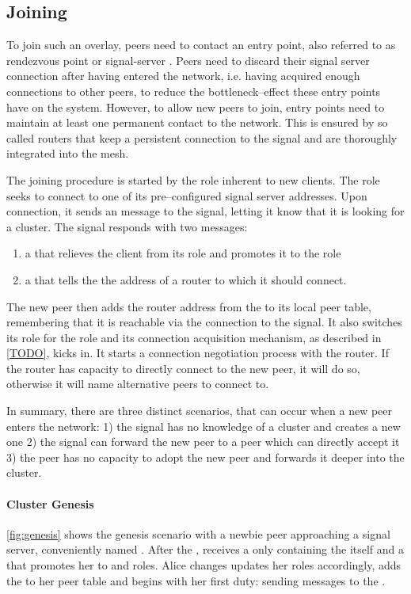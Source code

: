 \subsection{Joining}
To join such an overlay, peers need to contact an entry point, also referred to as rendezvous point or \gls{signal-server} \cite{TODO}.
Peers need to discard their signal server connection after having entered the network, i.e. having acquired enough connections to other peers, to reduce the bottleneck–effect these entry points have on the system.
However, to allow new peers to join, entry points need to maintain at least one permanent contact to the network. This is ensured by so called \glspl{router} that keep a persistent connection to the signal and are thoroughly integrated into the mesh.

The joining procedure is started by the \newbieRole role inherent to new clients. The \newbieRole role seeks to connect to one of its pre–configured signal server addresses.
Upon connection, it sends an \introduction message to the signal, letting it know that it is looking for a cluster. The signal responds with two messages:
\begin{enumerate}
    \item a \roleUpdate that relieves the client from its \newbieRole role and promotes it to the \peerRole role
    \item a \peerUpdate that tells the \newbieRole the address of a \gls{router} to which it should connect.
\end{enumerate}
The new peer then adds the router address from the \peerUpdate to its local peer table, remembering that it is reachable via the connection to the signal.
It also switches its \newbieRole role for the \peerRole role and its connection acquisition mechanism, as described in \ref{TODO}, kicks in. It starts a connection negotiation process with the router. If the router has capacity to directly connect to the new peer, it will do so, otherwise it will name alternative peers to connect to.

In summary, there are three distinct scenarios, that can occur when a new peer enters the network: 1) the signal has no knowledge of a cluster and creates a new one 2) the signal can forward the new peer to a \routerRole peer which can directly accept it 3) the \routerRole peer has no capacity to adopt the new peer and forwards it deeper into the cluster.

\paragraph{Cluster Genesis}
\vref{fig:genesis} shows the genesis scenario with a newbie peer \alice approaching a signal server, conveniently named \signal. After the \introduction, \alice receives a \peerUpdate only containing the \signal itself and a \roleUpdate that promotes her to \peerRole and \routerRole roles. Alice changes updates her roles accordingly, adds the \signal to her peer table and begins with her first \routerRole duty: sending \alive messages to the \signal.

